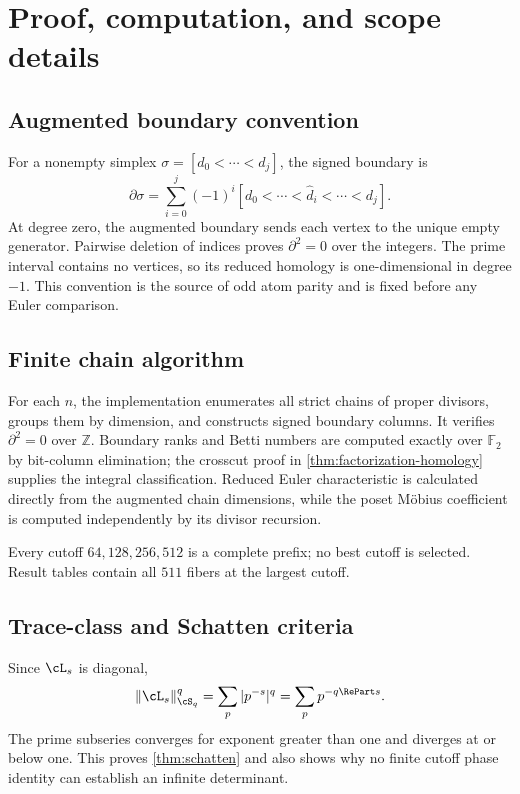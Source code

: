 \section{Proof, computation, and scope details}

\subsection{Augmented boundary convention}

For a nonempty simplex
$\sigma=[d_0<\cdots<d_j]$, the signed boundary is
\[
 \partial\sigma
 =\sum_{i=0}^j(-1)^i
 [d_0<\cdots<\widehat d_i<\cdots<d_j].
\]
At degree zero, the augmented boundary sends each vertex to the unique empty
generator. Pairwise deletion of indices proves $\partial^2=0$ over the
integers. The prime interval contains no vertices, so its reduced homology is
one-dimensional in degree $-1$. This convention is the source of odd atom
parity and is fixed before any Euler comparison.

\subsection{Finite chain algorithm}

For each $n$, the implementation enumerates all strict chains of proper
divisors, groups them by dimension, and constructs signed boundary columns.
It verifies $\partial^2=0$ over $\mathbb Z$. Boundary ranks and Betti numbers
are computed exactly over $\mathbb F_2$ by bit-column elimination; the
crosscut proof in \cref{thm:factorization-homology} supplies the integral
classification. Reduced Euler characteristic is calculated directly from
the augmented chain dimensions, while the poset M\"obius coefficient is
computed independently by its divisor recursion.

Every cutoff $64,128,256,512$ is a complete prefix; no best cutoff is
selected. Result tables contain all $511$ fibers at the largest cutoff.

\subsection{Trace-class and Schatten criteria}

Since $\cL_s$ is diagonal,
\[
 \|\cL_s\|_{\cS_q}^q
 =\sum_p|p^{-s}|^q
 =\sum_p p^{-q\RePart s}.
\]
The prime subseries converges for exponent greater than one and diverges at
or below one. This proves \cref{thm:schatten} and also shows why no finite
cutoff phase identity can establish an infinite determinant.

